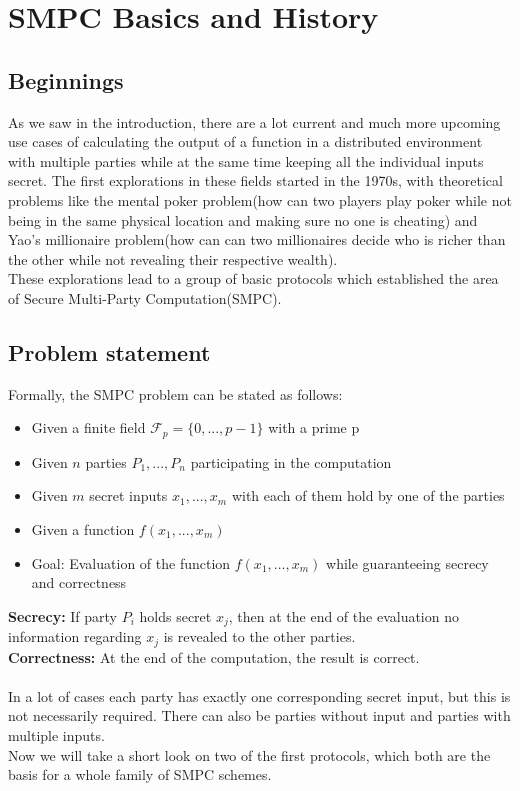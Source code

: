 \documentclass[english,runningheads,a4paper]{llncs}[2018/03/10]
\begin{document}
\section{SMPC Basics and History}\label{sec:smpc}

\subsection{Beginnings}
As we saw in the introduction, there are a lot current and much more upcoming use cases of calculating the output of a function in a distributed environment with multiple parties while at the same time keeping all the individual inputs secret. The first explorations in these fields started in the 1970s, with theoretical problems like the mental poker problem(how can two players play poker while not being in the same physical location and making sure no one is cheating) and Yao's millionaire problem(how can can two millionaires decide who is richer than the other while not revealing their respective wealth). \\
These explorations lead to a group of basic protocols which established the area of Secure Multi-Party Computation(SMPC).\\

\subsection{Problem statement}
Formally, the SMPC problem can be stated as follows:
\begin{itemize}
\item Given a finite field \( \mathcal{F}_p=\{0,...,p-1\}\) with a prime p
\item Given \(n\) parties \(P_1,...,P_n\) participating in the computation
\item Given \(m\) secret inputs \(x_1,...,x_m\) with each of them hold by one of the parties
\item Given a function \(f(x_1,...,x_m)\)
\item Goal: Evaluation of the function \(f(x_1,...,x_m)\) while guaranteeing secrecy and correctness
\end{itemize}
\textbf{Secrecy:} If party \(P_i\) holds secret \(x_j\), then at the end of the evaluation no information regarding \(x_j\) is revealed to the other parties.\\
\textbf{Correctness:} At the end of the computation, the result is correct.\\\\
In a lot of cases each party has exactly one corresponding secret input, but this is not necessarily required. There can also be parties without input and parties with multiple inputs.\\
Now we will take a short look on two of the first protocols, which both are the basis for a whole family of SMPC schemes.
\end{document}
